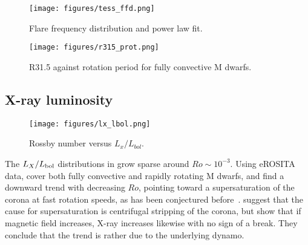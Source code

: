 \documentclass[twocolumn]{aastex631}
\begin{document}
\begin{figure}
    \begin{centering}
        \texttt{[image: figures/tess\_ffd.png]}
        \caption{
         Flare frequency distribution and power law fit.
        }
        \label{fig:ffd}
    \end{centering}
\end{figure}


\begin{figure}
    \begin{centering}
        \texttt{[image: figures/r315\_prot.png]}
        \caption{
         R31.5 against rotation period for fully convective M dwarfs.
        }
        \label{fig:r315}
    \end{centering}
\end{figure}


\subsection{X-ray luminosity}
\label{sec:discussion:xraylum}

\begin{figure}[ht!]
    \begin{centering}
        \texttt{[image: figures/lx\_lbol.png]}
        \caption{
         Rossby number versus $L_x/L_{bol}$.
        }
        \label{fig:lxlbol}
    \end{centering}
\end{figure}


The $L_X/L_{\rm bol}$ distributions in \citet{cook2014trends, wright2016solartype} grow sparse around $Ro\sim10^{-3}$. Using eROSITA data, \citet{magaudda2022first} cover both fully convective and rapidly rotating M dwarfs, and find a downward trend with decreasing $Ro$, pointing toward a supersaturation of the corona at fast rotation speeds, as has been conjectured before~\citep{jeffries2011investigating,ramsay2020tess}. \citet{jeffries2011investigating} suggest that the cause for supersaturation is centrifugal stripping of the corona, but \citet{reiners2022magnetism} show that if magnetic field increases, X-ray increases likewise with no sign of a break. They conclude that the trend is rather due to the underlying dynamo.

\cite{brown2023coronal}

\cite{johnstone2012soft}
\end{document}
